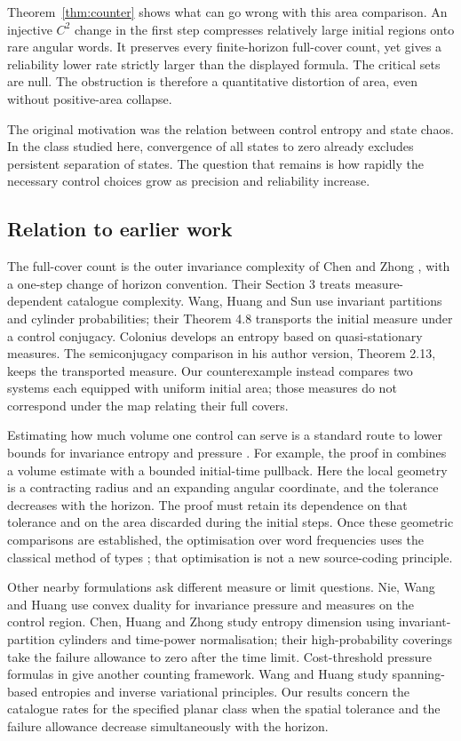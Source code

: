 \documentclass[11pt]{amsart}
\theoremstyle{definition}
\theoremstyle{remark}
\numberwithin{equation}{section}
\begin{document}
Theorem~\ref{thm:counter} shows what can go wrong with this area
comparison. An injective $C^2$ change in the first step compresses
relatively large initial regions onto rare angular words. It
preserves every finite-horizon full-cover count, yet gives a
reliability lower rate strictly larger than the displayed formula.
The critical sets are null. The obstruction is therefore a
quantitative distortion of area, even without positive-area collapse.

The original motivation was the relation between control entropy
and state chaos. In the class studied here, convergence of all
states to zero already excludes persistent separation of states.
The question that remains is how rapidly the necessary control
choices grow as precision and reliability increase.

\subsection{Relation to earlier work}
The full-cover count is the outer invariance complexity of Chen
and Zhong \cite[Section 2.2]{CZ2024}, with a one-step change of
horizon convention. Their Section 3 treats measure-dependent
catalogue complexity. Wang, Huang and Sun \cite{WHS2019} use
invariant partitions and cylinder probabilities; their Theorem 4.8
transports the initial measure under a control conjugacy.
Colonius \cite{Colonius2018} develops an entropy based on
quasi-stationary measures. The semiconjugacy comparison in his
author version, Theorem 2.13, keeps the transported measure. Our
counterexample instead compares two systems each equipped with
uniform initial area; those measures do not correspond under the
map relating their full covers.

Estimating how much volume one control can serve is a standard
route to lower bounds for invariance entropy and pressure
\cite{Kawan2011,DK2016,CCS2020}. For example, the proof in
\cite[Theorem 4.8, author version]{DK2016} combines a volume estimate with a
bounded initial-time pullback. Here the local geometry is a
contracting radius and an expanding angular coordinate, and the
tolerance decreases with the horizon. The proof must retain its
dependence on that tolerance and on the area discarded during
the initial steps. Once these geometric comparisons are established,
the optimisation over word frequencies uses the classical method
of types \cite{Csiszar1998}; that optimisation is not a new
source-coding principle.

Other nearby formulations ask different measure or limit questions.
Nie, Wang and Huang \cite{NWH2022} use convex duality for
invariance pressure and measures on the control region. Chen,
Huang and Zhong \cite{CHZ2026} study entropy dimension using
invariant-partition cylinders and time-power normalisation; their
high-probability coverings take the failure allowance to zero
after the time limit. Cost-threshold pressure formulas in
\cite{YCYZ2025} give another counting framework. Wang and Huang
\cite{WH2022} study spanning-based entropies and inverse variational
principles. Our results concern the catalogue rates for the specified
planar class when the spatial tolerance and the failure allowance
decrease simultaneously with the horizon.
\end{document}
